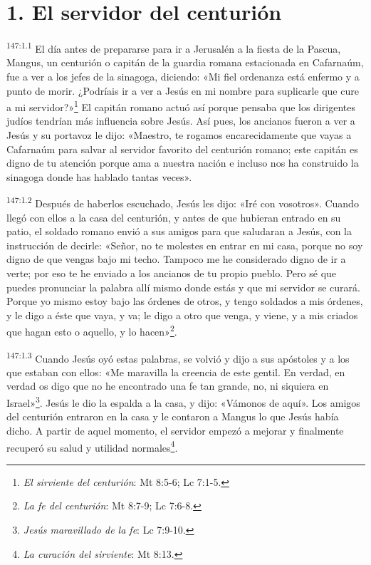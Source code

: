 \section*{1. El servidor del centurión}
\par
\textsuperscript{147:1.1} El día antes de prepararse para ir a Jerusalén a la fiesta de la Pascua, Mangus, un centurión o capitán de la guardia romana estacionada en Cafarnaúm, fue a ver a los jefes de la sinagoga, diciendo: «Mi fiel ordenanza está enfermo y a punto de morir. ¿Podríais ir a ver a Jesús en mi nombre para suplicarle que cure a mi servidor?»\footnote{\textit{El sirviente del centurión}: Mt 8:5-6; Lc 7:1-5.} El capitán romano actuó así porque pensaba que los dirigentes judíos tendrían más influencia sobre Jesús. Así pues, los ancianos fueron a ver a Jesús y su portavoz le dijo: «Maestro, te rogamos encarecidamente que vayas a Cafarnaúm para salvar al servidor favorito del centurión romano; este capitán es digno de tu atención porque ama a nuestra nación e incluso nos ha construido la sinagoga donde has hablado tantas veces».

\par
\textsuperscript{147:1.2} Después de haberlos escuchado, Jesús les dijo: «Iré con vosotros». Cuando llegó con ellos a la casa del centurión, y antes de que hubieran entrado en su patio, el soldado romano envió a sus amigos para que saludaran a Jesús, con la instrucción de decirle: «Señor, no te molestes en entrar en mi casa, porque no soy digno de que vengas bajo mi techo. Tampoco me he considerado digno de ir a verte; por eso te he enviado a los ancianos de tu propio pueblo. Pero sé que puedes pronunciar la palabra allí mismo donde estás y que mi servidor se curará. Porque yo mismo estoy bajo las órdenes de otros, y tengo soldados a mis órdenes, y le digo a éste que vaya, y va; le digo a otro que venga, y viene, y a mis criados que hagan esto o aquello, y lo hacen»\footnote{\textit{La fe del centurión}: Mt 8:7-9; Lc 7:6-8.}.

\par
\textsuperscript{147:1.3} Cuando Jesús oyó estas palabras, se volvió y dijo a sus apóstoles y a los que estaban con ellos: «Me maravilla la creencia de este gentil. En verdad, en verdad os digo que no he encontrado una fe tan grande, no, ni siquiera en Israel»\footnote{\textit{Jesús maravillado de la fe}: Lc 7:9-10.}. Jesús le dio la espalda a la casa, y dijo: «Vámonos de aquí». Los amigos del centurión entraron en la casa y le contaron a Mangus lo que Jesús había dicho. A partir de aquel momento, el servidor empezó a mejorar y finalmente recuperó su salud y utilidad normales\footnote{\textit{La curación del sirviente}: Mt 8:13.}.

